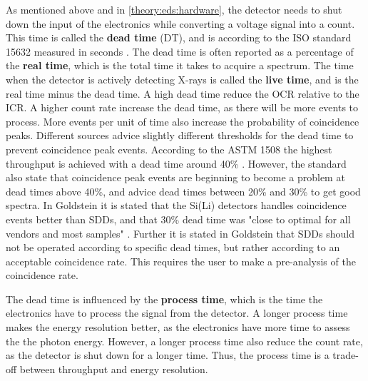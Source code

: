 As mentioned above and in \cref{theory:eds:hardware}, the detector needs to shut down the input of the electronics while converting a voltage signal into a count.
This time is called the \textbf{dead time} (DT), and is according to the ISO standard 15632 measured in seconds \cite{iso_qc_15632}.
The dead time is often reported as a percentage of the \textbf{real time}, which is the total time it takes to acquire a spectrum.
The time when the detector is actively detecting X-rays is called the \textbf{live time}, and is the real time minus the dead time.
A high dead time reduce the OCR relative to the ICR.
A higher count rate increase the dead time, as there will be more events to process.
More events per unit of time also increase the probability of coincidence peaks.
Different sources advice slightly different thresholds for the dead time to prevent coincidence peak events.
According to the ASTM 1508 the highest throughput is achieved with a dead time around 40\% \cite{astm_e1508_eds_quantification}.
However, the standard also state that coincidence peak events are beginning to become a problem at dead times above 40\%, and advice dead times between 20\% and 30\% to get good spectra.
In Goldstein it is stated that the Si(Li) detectors handles coincidence events better than SDDs, and that 30\% dead time was "close to optimal for all vendors and most samples" \cite[p. 466]{goldstein_scanning_2018}.
Further it is stated in Goldstein that SDDs should not be operated according to specific dead times, but rather according to an acceptable coincidence rate.
This requires the user to make a pre-analysis of the coincidence rate.


The dead time is influenced by the \textbf{process time}, which is the time the electronics have to process the signal from the detector.
A longer process time makes the energy resolution better, as the electronics have more time to assess the the photon energy.
However, a longer process time also reduce the count rate, as the detector is shut down for a longer time.
Thus, the process time is a trade-off between throughput and energy resolution.


